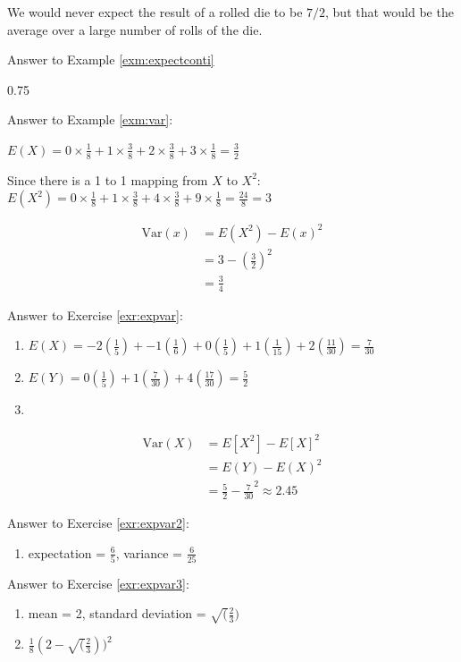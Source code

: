 \documentclass[
]{book}
\providecommand{\tightlist}{%
  \setlength{\itemsep}{0pt}\setlength{\parskip}{0pt}}
\theoremstyle{definition}
\theoremstyle{definition}
\theoremstyle{definition}
\theoremstyle{definition}
\theoremstyle{remark}
\begin{document}
We would never expect the result of a rolled die to be \(7/2\), but that would be the average over a large number of rolls of the die.

Answer to Example \ref{exm:expectconti}

0.75

Answer to Example \ref{exm:var}:

\(E(X) = 0 \times \frac{1}{8} + 1 \times \frac{3}{8} + 2 \times \frac{3}{8} + 3 \times \frac{1}{8} = \frac{3}{2}\)

Since there is a 1 to 1 mapping from \(X\) to \(X^2:\) \(E(X^2) = 0 \times \frac{1}{8} + 1 \times \frac{3}{8} + 4 \times \frac{3}{8} + 9 \times \frac{1}{8} = \frac{24}{8} = 3\)

\begin{align*}
\text{Var}(x) &= E(X^2) - E(x)^2\\
&= 3 - (\frac{3}{2})^2\\
&= \frac{3}{4}
\end{align*}

Answer to Exercise \ref{exr:expvar}:

\begin{enumerate}
\def\labelenumi{\arabic{enumi}.}
\item
  \(E(X) = -2(\frac{1}{5}) + -1(\frac{1}{6}) + 0(\frac{1}{5}) + 1(\frac{1}{15}) + 2(\frac{11}{30}) = \frac{7}{30}\)
\item
  \(E(Y) = 0(\frac{1}{5}) + 1(\frac{7}{30}) + 4(\frac{17}{30}) = \frac{5}{2}\)
\item
\end{enumerate}

\begin{align*}
\text{Var}(X) &= E[X^2] - E[X]^2\\
&= E(Y) - E(X)^2\\
&= \frac{5}{2} - \frac{7}{30}^2 \approx 2.45
\end{align*}

Answer to Exercise \ref{exr:expvar2}:

\begin{enumerate}
\def\labelenumi{\arabic{enumi}.}
\tightlist
\item
  expectation = \(\frac{6}{5}\), variance = \(\frac{6}{25}\)
\end{enumerate}

Answer to Exercise \ref{exr:expvar3}:

\begin{enumerate}
\def\labelenumi{\arabic{enumi}.}
\item
  mean = 2, standard deviation = \(\sqrt(\frac{2}{3})\)
\item
  \(\frac{1}{8}(2 - \sqrt(\frac{2}{3}))^2\)
\end{enumerate}
\end{document}
